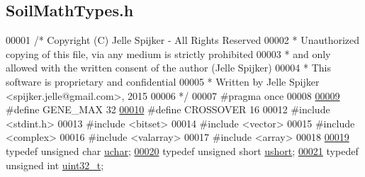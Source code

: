 \hypertarget{_soil_math_types_8h_source}{}\subsection{Soil\+Math\+Types.\+h}
\label{_soil_math_types_8h_source}

\begin{DoxyCode}
00001 \textcolor{comment}{/* Copyright (C) Jelle Spijker - All Rights Reserved}
00002 \textcolor{comment}{ * Unauthorized copying of this file, via any medium is strictly prohibited}
00003 \textcolor{comment}{ * and only allowed with the written consent of the author (Jelle Spijker)}
00004 \textcolor{comment}{ * This software is proprietary and confidential}
00005 \textcolor{comment}{ * Written by Jelle Spijker <spijker.jelle@gmail.com>, 2015}
00006 \textcolor{comment}{ */}
00007 \textcolor{preprocessor}{#pragma once}
00008 
\hypertarget{_soil_math_types_8h_source_l00009}{}\hyperlink{_soil_math_types_8h_aa5e1eb1a998e5ed69af2076cf318df4b}{00009} \textcolor{preprocessor}{#define GENE\_MAX 32  }
\hypertarget{_soil_math_types_8h_source_l00010}{}\hyperlink{_soil_math_types_8h_ae84e527452fcf9dfc8ef8fd0dd5cd598}{00010} \textcolor{preprocessor}{#define CROSSOVER 16 }
00012 \textcolor{preprocessor}{#include <stdint.h>}
00013 \textcolor{preprocessor}{#include <bitset>}
00014 \textcolor{preprocessor}{#include <vector>}
00015 \textcolor{preprocessor}{#include <complex>}
00016 \textcolor{preprocessor}{#include <valarray>}
00017 \textcolor{preprocessor}{#include <array>}
00018 
\hypertarget{_soil_math_types_8h_source_l00019}{}\hyperlink{_soil_math_types_8h_a65f85814a8290f9797005d3b28e7e5fc}{00019} \textcolor{keyword}{typedef} \textcolor{keywordtype}{unsigned} \textcolor{keywordtype}{char} \hyperlink{_soil_math_types_8h_a65f85814a8290f9797005d3b28e7e5fc}{uchar};   
\hypertarget{_soil_math_types_8h_source_l00020}{}\hyperlink{_soil_math_types_8h_ab95f123a6c9bcfee6a343170ef8c5f69}{00020} \textcolor{keyword}{typedef} \textcolor{keywordtype}{unsigned} \textcolor{keywordtype}{short} \hyperlink{_soil_math_types_8h_ab95f123a6c9bcfee6a343170ef8c5f69}{ushort}; 
\hypertarget{_soil_math_types_8h_source_l00021}{}\hyperlink{_soil_math_types_8h_a435d1572bf3f880d55459d9805097f62}{00021} \textcolor{keyword}{typedef} \textcolor{keywordtype}{unsigned} \textcolor{keywordtype}{int} \hyperlink{_soil_math_types_8h_a435d1572bf3f880d55459d9805097f62}{uint32\_t};

\end{DoxyCode}
